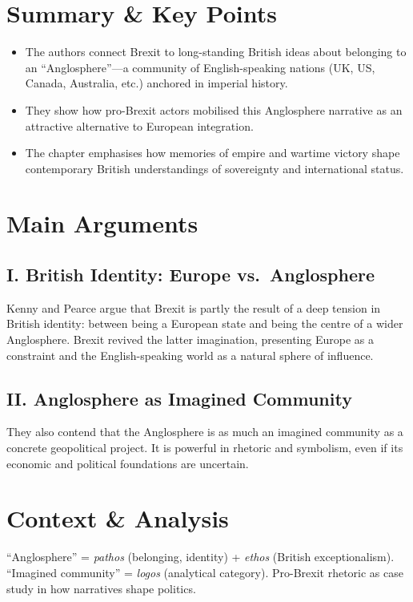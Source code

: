 \documentclass[11pt,a4paper]{article}
\begin{document}
\section*{Summary \& Key Points}

\begin{itemize}
\item The authors connect Brexit to long-standing British ideas about belonging to an ``Anglosphere''---a community of English-speaking nations (UK, US, Canada, Australia, etc.) anchored in imperial history.
\item They show how pro-Brexit actors mobilised this Anglosphere narrative as an attractive alternative to European integration.
\item The chapter emphasises how memories of empire and wartime victory shape contemporary British understandings of sovereignty and international status.
\end{itemize}

\section*{Main Arguments}

\subsection*{I. British Identity: Europe vs.\ Anglosphere}

Kenny and Pearce argue that Brexit is partly the result of a deep tension in British identity: between being a European state and being the centre of a wider Anglosphere. Brexit revived the latter imagination, presenting Europe as a constraint and the English-speaking world as a natural sphere of influence.

\subsection*{II. Anglosphere as Imagined Community}

They also contend that the Anglosphere is as much an imagined community as a concrete geopolitical project. It is powerful in rhetoric and symbolism, even if its economic and political foundations are uncertain.

\section*{Context \& Analysis}

``Anglosphere'' = \textit{pathos} (belonging, identity) + \textit{ethos} (British exceptionalism). ``Imagined community'' = \textit{logos} (analytical category). Pro-Brexit rhetoric as case study in how narratives shape politics.
\end{document}
